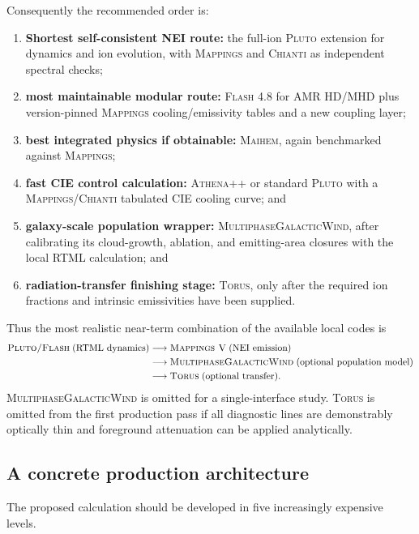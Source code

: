 \documentclass[english,a4paper]{my_memo2}
\begin{document}
Consequently the recommended order is:
\begin{enumerate}[leftmargin=*]
\item \textbf{Shortest self-consistent NEI route:} the full-ion
\textsc{Pluto} extension for dynamics and ion evolution, with
\textsc{Mappings} and \textsc{Chianti} as independent spectral checks;
\item \textbf{most maintainable modular route:} \textsc{Flash} 4.8 for AMR
HD/MHD plus version-pinned \textsc{Mappings} cooling/emissivity tables and a
new coupling layer;
\item \textbf{best integrated physics if obtainable:} \textsc{Maihem}, again
benchmarked against \textsc{Mappings};
\item \textbf{fast CIE control calculation:} \textsc{Athena++} or standard
\textsc{Pluto} with a \textsc{Mappings}/\textsc{Chianti} tabulated CIE cooling
curve; and
\item \textbf{galaxy-scale population wrapper:}
\textsc{MultiphaseGalacticWind}, after calibrating its cloud-growth,
ablation, and emitting-area closures with the local RTML calculation; and
\item \textbf{radiation-transfer finishing stage:} \textsc{Torus}, only after
the required ion fractions and intrinsic emissivities have been supplied.
\end{enumerate}

Thus the most realistic near-term combination of the available local codes is
\[
\begin{aligned}
 \textsc{Pluto/Flash}\;(\text{RTML dynamics})
 &\longrightarrow \textsc{Mappings~V}\;(\text{NEI emission})\\
 &\longrightarrow \textsc{MultiphaseGalacticWind}\;
   (\text{optional population model})\\
 &\longrightarrow \textsc{Torus}\;(\text{optional transfer}).
\end{aligned}
\]
\textsc{MultiphaseGalacticWind} is omitted for a single-interface study.
\textsc{Torus} is omitted from the first production pass if all diagnostic
lines are demonstrably optically thin and foreground attenuation can be
applied analytically.

\subsection{A concrete production architecture}

The proposed calculation should be developed in five increasingly expensive
levels.
\end{document}
